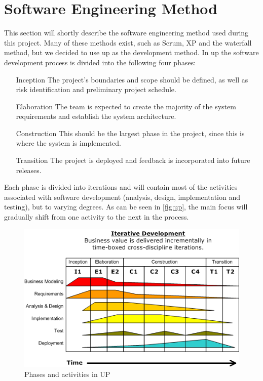 \section{Software Engineering Method}
This section will shortly describe the software engineering method used during this project. Many of these methods exist, such as Scrum, XP and the waterfall method, but we decided to use \ac{up} as the development method. In \ac{up} the software development process is divided into the following four phases: 

\begin{itemize}
\item[Inception] The project's boundaries and scope should be defined, as well as risk identification and preliminary project schedule.
\item[Elaboration] The team is expected to create the majority of the system requirements and establish the system architecture.
\item[Construction] This should be the largest phase in the project, since this is where the system is implemented.
\item[Transition] The project is deployed and feedback is incorporated into future releases.
\end{itemize}

Each phase is divided into iterations and will contain most of the activities associated with software development (analysis, design, implementation and testing), but to varying degrees. As can be seen in \autoref{fig:up}, the main focus will gradually shift from one activity to the next in the process.

\begin{figure}[hptb]
  \centering
    \includegraphics[width=\textwidth]{img/Development-iterative.png}
  \caption{Phases and activities in UP}
  \label{fig:up}
\end{figure}

